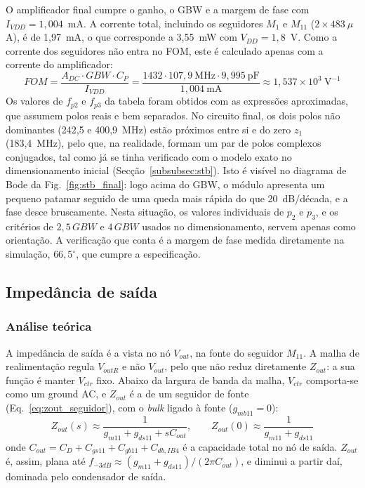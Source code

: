 O amplificador final cumpre o ganho, o GBW e a margem de fase com $I_{VDD} = 1{,}004$~mA. A corrente total, incluindo os
seguidores $M_1$ e $M_{11}$ ($2 \times 483~\mu$A), é de 1,97~mA, o que corresponde a 3,55~mW com $V_{DD} = 1{,}8$~V. Como a
corrente dos seguidores não entra no FOM, este é calculado apenas com a corrente do amplificador:
\begin{equation}
    FOM = \frac{A_{DC}\cdot GBW\cdot C_P}{I_{VDD}} = \frac{1432 \cdot 107{,}9~\text{MHz} \cdot 9{,}995~\text{pF}}{1{,}004~\text{mA}}
    \approx 1{,}537\times10^{3}~\text{V}^{-1}
\end{equation}
Os valores de $f_{p2}$ e $f_{p3}$ da tabela foram obtidos com as expressões aproximadas, que assumem polos reais e bem
separados. No circuito final, os dois polos não dominantes (242,5 e 400,9~MHz) estão próximos entre si e do zero $z_1$
(183,4~MHz), pelo que, na realidade, formam um par de polos complexos conjugados, tal como já se tinha verificado com o
modelo exato no dimensionamento inicial (Secção~\ref{subsubsec:stb}). Isto é visível no diagrama de Bode da
Fig.~\ref{fig:stb_final}: logo acima do GBW, o módulo apresenta um pequeno patamar seguido de uma queda mais rápida do que
20~dB/década, e a fase desce bruscamente. Nesta situação, os valores individuais de $p_2$ e $p_3$, e os critérios de
$2{,}5\,GBW$ e $4\,GBW$ usados no dimensionamento, servem apenas como orientação. A verificação que conta é a margem de
fase medida diretamente na simulação, $66{,}5^\circ$, que cumpre a especificação.

\subsection{Impedância de saída}
\label{subsec:zout}

\subsubsection{Análise teórica}

A impedância de saída é a vista no nó $V_{out}$, na fonte do seguidor $M_{11}$. A malha de realimentação regula
$V_{outR}$ e não $V_{out}$, pelo que não reduz diretamente $Z_{out}$: a sua função é manter $V_{ctr}$ fixo. Abaixo da
largura de banda da malha, $V_{ctr}$ comporta-se como um ground AC, e $Z_{out}$ é a de um seguidor de fonte
(Eq.~\eqref{eq:zout_seguidor}), com o \textit{bulk} ligado à fonte ($g_{mb11} = 0$):
\begin{equation}
    Z_{out}(s) \approx \frac{1}{g_{m11} + g_{ds11} + sC_{out}}, \qquad
    Z_{out}(0) \approx \frac{1}{g_{m11} + g_{ds11}}
    \label{eq:zout_teo}
\end{equation}
onde $C_{out} = C_D + C_{gs11} + C_{gb11} + C_{db,IB4}$ é a capacidade total no nó de saída. $Z_{out}$ é, assim, plana
até $f_{-3dB} \approx (g_{m11}+g_{ds11})/(2\pi C_{out})$, e diminui a partir daí, dominada pelo condensador de saída.

